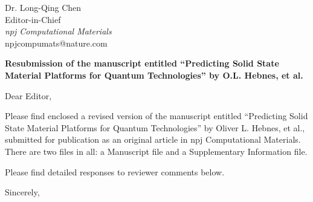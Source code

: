 \documentclass[11pt, a4paper]{letter} %
\begin{document}

\begin{letter}{
	Dr. Long-Qing Chen\\
	Editor-in-Chief\\
	\textit{npj Computational Materials} \\ 
	npjcompumats@nature.com \\ 
}


\opening{}

\begin{center}
   \textbf{Resubmission of the manuscript entitled “Predicting Solid State Material Platforms for Quantum Technologies” by O.L. Hebnes, et al.}
\end{center}

\noindent
Dear Editor, 

Please find enclosed a revised version of the manuscript entitled “Predicting Solid State Material Platforms for Quantum Technologies” by Oliver L. Hebnes, et al., submitted for publication as an original article in npj Computational Materials. There are two files in all: a Manuscript file and a Supplementary Information file. 

Please find detailed responses to reviewer comments below.


\closing{Sincerely,}





\end{letter}



\newpage 
\end{document}
